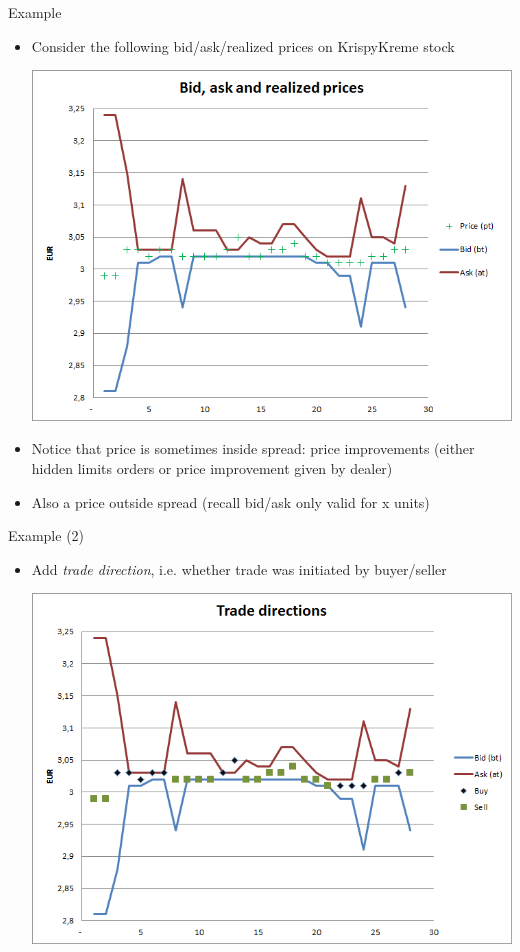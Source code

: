 \documentclass[english,10pt]{beamer}
\begin{document}
\begin{frame}{Example}
	\begin{itemize}
		\item Consider the following bid/ask/realized prices on KrispyKreme stock
		\begin{center}
			\includegraphics[scale=0.34]{pics/L2_bidask}
		\end{center}
		\item Notice that price is sometimes inside spread: price improvements (either hidden limits orders or price improvement given by dealer)
		\item Also a price outside spread (recall bid/ask only valid for x units)
	\end{itemize}
\end{frame}


\begin{frame}{Example (2)}
	\begin{itemize}
		\item Add \textit{trade direction}, i.e. whether trade was initiated by buyer/seller
		\begin{center}
			\includegraphics[scale=0.39]{pics/L2_directions}
		\end{center}
	\end{itemize}
\end{frame}
\end{document}

